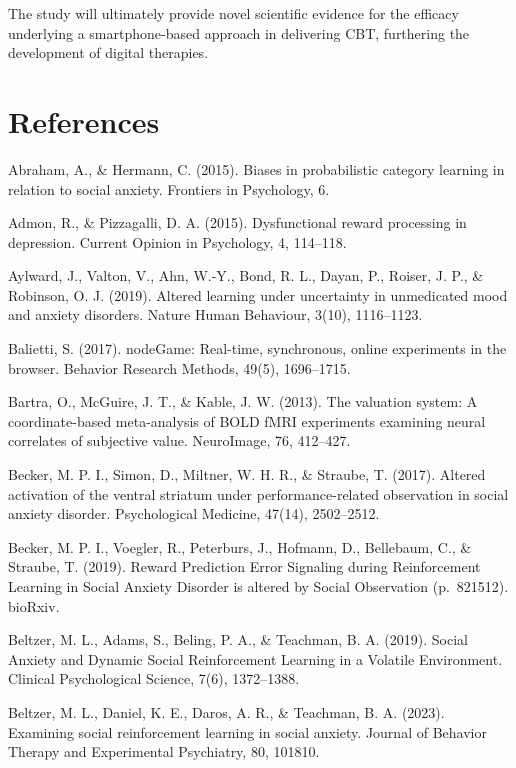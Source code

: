 \documentclass[12pt,a4paper,oneside,]{book} %
\begin{document}
The study will ultimately provide novel scientific evidence for the efficacy underlying a smartphone-based approach in delivering CBT, furthering the development of digital therapies.

\backmatter

\chapter*{References}\label{references}

\chaptermark{}

\setlength{\parindent}{0pt}
\setlength{\leftskip}{0em}
\setlength{\parskip}{1em}

Abraham, A., \& Hermann, C. (2015). Biases in probabilistic category learning in relation to social anxiety. Frontiers in Psychology, 6.

Admon, R., \& Pizzagalli, D. A. (2015). Dysfunctional reward processing in depression. Current Opinion in Psychology, 4, 114--118.

Aylward, J., Valton, V., Ahn, W.-Y., Bond, R. L., Dayan, P., Roiser, J. P., \& Robinson, O. J. (2019). Altered learning under uncertainty in unmedicated mood and anxiety disorders. Nature Human Behaviour, 3(10), 1116--1123.

Balietti, S. (2017). nodeGame: Real-time, synchronous, online experiments in the browser. Behavior Research Methods, 49(5), 1696--1715.

Bartra, O., McGuire, J. T., \& Kable, J. W. (2013). The valuation system: A coordinate-based meta-analysis of BOLD fMRI experiments examining neural correlates of subjective value. NeuroImage, 76, 412--427.

Becker, M. P. I., Simon, D., Miltner, W. H. R., \& Straube, T. (2017). Altered activation of the ventral striatum under performance-related observation in social anxiety disorder. Psychological Medicine, 47(14), 2502--2512.

Becker, M. P. I., Voegler, R., Peterburs, J., Hofmann, D., Bellebaum, C., \& Straube, T. (2019). Reward Prediction Error Signaling during Reinforcement Learning in Social Anxiety Disorder is altered by Social Observation (p.~821512). bioRxiv.

Beltzer, M. L., Adams, S., Beling, P. A., \& Teachman, B. A. (2019). Social Anxiety and Dynamic Social Reinforcement Learning in a Volatile Environment. Clinical Psychological Science, 7(6), 1372--1388.

Beltzer, M. L., Daniel, K. E., Daros, A. R., \& Teachman, B. A. (2023). Examining social reinforcement learning in social anxiety. Journal of Behavior Therapy and Experimental Psychiatry, 80, 101810.
\end{document}
